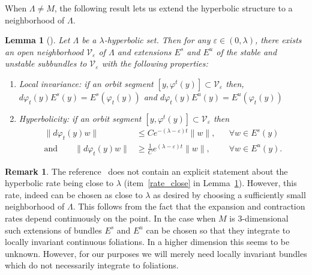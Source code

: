 \documentclass[JEP,XML,SOM,Unicode,NoFloatCountersInSection]{cedram}
\newtheorem{lemma}[theorem]{Lemma}
\theoremstyle{definition}
\newtheorem{remark}[theorem]{Remark}
\let\phi\varphi
\let\eps\varepsilon
\renewcommand{\>}{{\rangle}}
\newcommand{\<}{{\langle}}
\begin{document}
When $\Lambda\neq M$, the following result lets us extend the hyperbolic structure to a neighborhood of $\Lambda$.
\begin{lemma}[\cite{HPPS70}]\label{lem: loc_hyp}
Let $\Lambda$ be a $\lambda$-hyperbolic set. Then for any $\eps\in (0,\lambda)$,
there exists an open neighborhood $\mathcal V_\eps$ of $\Lambda$ and extensions $E^s$ and $E^u$ of the stable and unstable subbundles to $\mathcal V_\eps$ with the following properties:
\begin{enumerate}
\item\label{loc_inv} Local invariance: if an orbit segment $[y, \phi^t(y)]\subset \mathcal V_\eps$ then, $d\phi_t(y)E^s(y)=E^s(\phi_t(y))$ and $d\phi_t(y)E^u(y)=E^u(\phi_t(y))$
\item\label{rate_close} Hyperbolicity: if an orbit segment $[y, \phi^t(y)]\subset \mathcal V_\eps$ then
\[
\begin{aligned}
\|d\phi_t(y)w\|&\leq Ce^{-(\lambda-\eps)t}\|w\|, && \forall w\in E^s(y)\\
\text{and} \qquad\|d\phi_t(y)w\|&\geq \frac 1Ce^{(\lambda-\eps)t}\|w\|, && \forall w\in E^u(y).
\end{aligned}
\]
\end{enumerate}
\end{lemma}

\begin{remark}
The reference~\cite{HPPS70} does not contain an explicit statement about the hyperbolic rate being close to $\lambda$ (item~\eqref{rate_close} in Lemma~\ref{lem: loc_hyp}). However, this rate, indeed can be chosen as close to $\lambda$ as desired by choosing a sufficiently small neighborhood of $\Lambda$. This follows from the fact that the expansion and contraction rates depend continuously on the point. In the case when $M$ is 3-dimensional such extensions of bundles $E^s$ and $E^u$ can be chosen so that they integrate to locally invariant continuous foliations. In a higher dimension this seems to be unknown. However, for our purposes we will merely need locally invariant bundles which do not necessarily integrate to foliations.
\end{remark}
\end{document}
